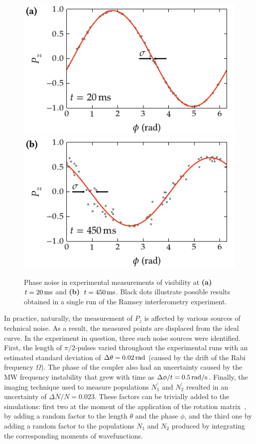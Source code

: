 \begin{figure}
    \centerline{%
    \includegraphics{figures_generated/bec_noise/illustration_noise_20ms.pdf}%
    \includegraphics{figures_generated/bec_noise/illustration_noise_450ms.pdf}}

    \caption[Phase noise in experimental measurements of visibility]{
    Phase noise in experimental measurements of visibility at \textbf{(a)}~$t = 20\mbox{\ensuremath{\,\mathrm{ms}}}$ and \textbf{(b)}~$t = 450\mbox{\ensuremath{\,\mathrm{ms}}}$.
    Black dots illustrate possible results obtained in a single run of the Ramsey interferometry experiment.}%

    \label{fig:bec-noise:phase-noise:illustration}
\end{figure}

In practice, naturally, the measurement of $P_z$ is affected by various sources of technical noise.
As a result, the measured points are displaced from the ideal curve.
In the experiment in question, three such noise sources were identified.
First, the length of $\pi/2$-pulses varied throughout the experimental runs with an estimated standard deviation of $\Delta \theta = 0.02\mbox{\ensuremath{\,\mathrm{rad}}}$ (caused by the drift of the Rabi frequency $\Omega$).
The phase of the coupler also had an uncertainty caused by the MW frequency instability that grew with time as $\Delta \phi / t = 0.5\mbox{\ensuremath{\,\mathrm{rad/s}}}$.
Finally, the imaging technique used to measure populations $N_1^\prime$ and $N_2^\prime$ resulted in an uncertainty of $\Delta N / N = 0.023$.
These factors can be trivially added to the simulations: first two at the moment of the application of the rotation matrix~, by adding a random factor to the length $\theta$ and the phase $\phi$, and the third one by adding a random factor to the populations $N_1$ and $N_2$ produced by integrating the corresponding moments of wavefunctions.

